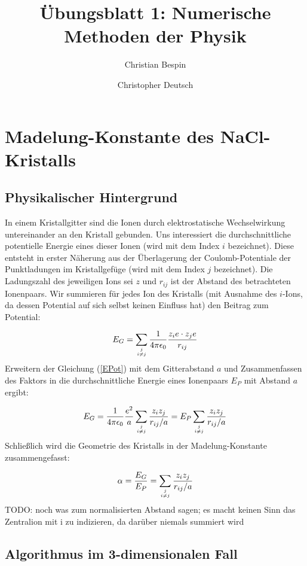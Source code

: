 \documentclass[10pt,a4paper]{article}
\author{Christian Bespin \and Christopher Deutsch}
\title{Übungsblatt 1: Numerische Methoden der Physik}
\begin{document}
\maketitle

\section{Madelung-Konstante des NaCl-Kristalls}
\subsection{Physikalischer Hintergrund}
In einem Kristallgitter sind die Ionen durch elektrostatische Wechselwirkung untereinander an den Kristall gebunden.
Uns interessiert die durchschnittliche potentielle Energie eines dieser Ionen (wird mit dem Index $i$ bezeichnet).
Diese entsteht in erster Näherung aus der Überlagerung der Coulomb-Potentiale der Punktladungen im Kristallgefüge
(wird mit dem Index $j$ bezeichnet). Die Ladungszahl des jeweiligen Ions sei $z$ und $r_{ij}$ ist der Abstand des
betrachteten Ionenpaars. Wir summieren für jedes Ion des Kristalls (mit Ausnahme des $i$-Ions, da dessen Potential
auf sich selbst keinen Einfluss hat) den Beitrag zum Potential:

\begin{align}
\label{EPot}
E_G = \sum_{j\atop i \neq j} \frac{1}{4 \pi \epsilon_0}  \frac{z_i e \cdot z_j e}{r_{ij}}
\end{align}
Erweitern der Gleichung (\ref{EPot}) mit dem Gitterabstand $a$ und Zusammenfassen des Faktors in die durchschnittliche
Energie eines Ionenpaars $E_P$ mit Abstand $a$ ergibt:

\begin{align}
E_G = \frac{1}{4 \pi \epsilon_0} \frac{e^2}{a} \sum_{j\atop i \neq j} \frac{z_i z_j}{r_{ij}/a} = E_P \sum_{j\atop i \neq j} \frac{z_i z_j}{r_{ij}/a}
\end{align}
Schließlich wird die Geometrie des Kristalls in der Madelung-Konstante zusammengefasst:

\begin{align}
\label{Madelungkonstante}
\alpha = \frac{E_G}{E_P} = \sum_{j\atop i \neq j} \frac{z_i z_j}{r_{ij}/a}
\end{align}
TODO: noch was zum normalisierten Abstand sagen; es macht keinen Sinn das Zentralion mit i zu indizieren, da darüber niemals summiert wird

\subsection{Algorithmus im 3-dimensionalen Fall}
\end{document}

